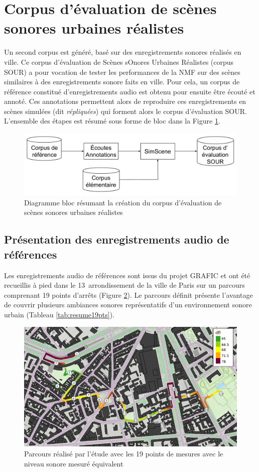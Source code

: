 \section{Corpus d'évaluation de scènes sonores urbaines réalistes}
\label{part:corpus_grafic}

Un second corpus est généré, basé sur des enregistrements sonores réalisés en ville. Ce corpus d'évaluation de Scènes sOnores Urbaines Réalistes (corpus SOUR) a pour vocation de tester les performances de la NMF sur des scènes similaires à des enregistrements sonore faits en ville. Pour cela, un corpus de référence constitué d'enregistrements audio est obtenu pour ensuite être écouté et annoté. Ces annotations permettent alors de reproduire ces enregistrements en scènes simulées (dit \textit{répliquées}) qui forment alors le corpus d'évaluation SOUR. L'ensemble des étapes est résumé sous forme de bloc dans la Figure \ref{fig:bloc_diagram_annotation}.

\begin{figure}[ht]
\centering
\includegraphics[width=.7\textwidth]{./figures/autres/bloc_diagram_annotation.pdf}
\caption{Diagramme bloc résumant la création du corpus d'évaluation de scènes sonores urbaines réalistes}
\label{fig:bloc_diagram_annotation}
\end{figure}

\subsection{Présentation des enregistrements audio de références}

Les enregistrements audio de références sont issus du projet GRAFIC \cite{aumond2017modeling} et ont été recueillis à pied dans le 13\ieme~arrondissement de la ville de Paris sur un parcours comprenant 19 points d'arrêts (Figure \ref{fig:parcoursGRAFIC}). Le parcours définit présente l'avantage de couvrir plusieurs ambiances sonores représentatifs d'un environnement sonore urbain (Tableau \ref{tab:resume19pts}).\\

\begin{figure}[hbtp]
\centering
\includegraphics[width=.7\textwidth]{./figures/grafic/trajet_19pts.png}
\caption{Parcours réalisé par l'étude avec les 19 points de mesures avec le niveau sonore mesuré équivalent}
\label{fig:parcoursGRAFIC}
\end{figure}

